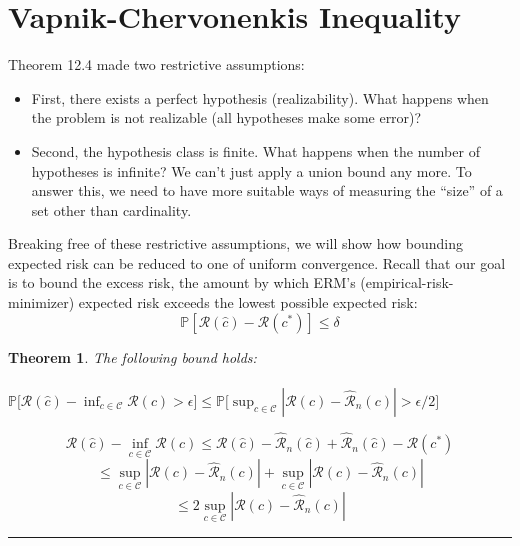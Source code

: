 \documentclass[twoside]{article}
\newcounter{lecnum}
\newtheorem{theorem}{Theorem}[lecnum]
\newenvironment{proof}{{\bf Proof:}}{\hfill\rule{2mm}{2mm}}
\begin{document}
\section{Vapnik-Chervonenkis Inequality}

Theorem 12.4 made two restrictive assumptions:
\begin{itemize}
    \item First, there exists a perfect hypothesis (realizability). What happens when the
problem is not realizable (all hypotheses make some error)? 
\item Second, the hypothesis class is finite. What happens when the number of hypotheses is infinite? We can’t just apply a union bound any more. To answer
this, we need to have more suitable ways of measuring the “size” of a set other
than cardinality. 
\end{itemize}

Breaking free of these restrictive assumptions, we will show how bounding expected
risk can be reduced to one of uniform convergence. Recall that our goal is to bound
the excess risk, the amount by which ERM’s (empirical-risk-minimizer) expected risk exceeds the lowest possible
expected risk:
$$\mathbb{P}[\mathcal{R}(\hat{c})- \mathcal{R}(c^*)] \leq \delta$$

\begin{theorem} The following bound holds:\\ \\
$\mathbb{P}\Big[\mathcal{R}(\hat{c}) - \inf_{c \in \mathcal{C}}{\mathcal{R}(c)} > \epsilon \Big] \leq \mathbb{P}\Big[ \sup_{c \in  \mathcal{C}}{|\mathcal{R}(c)- \mathcal{\hat{R}}_{n}(c) | > \epsilon/2} \Big]$
\end{theorem}

\begin{proof}
$$\mathcal{R}(\hat{c})- \inf_{c \in \mathcal{C}}{\mathcal{R}(c)} \leq \mathcal{R}(\hat{c})- \mathcal{\hat{R}}_{n}(\hat{c})+
\mathcal{\hat{R}}_{n}(\hat{c}) - \mathcal{R}(c^*)$$
$$\leq \sup_{c \in  \mathcal{C}}{|\mathcal{R}(c)- \mathcal{\hat{R}}_{n}(c)|} + \sup_{c \in  \mathcal{C}}{|\mathcal{R}(c)- \mathcal{\hat{R}}_{n}(c) |}$$
$$\leq 2\sup_{c \in  \mathcal{C}}{|\mathcal{R}(c)- \mathcal{\hat{R}}_{n}(c)|}$$
\end{proof}
\end{document}
